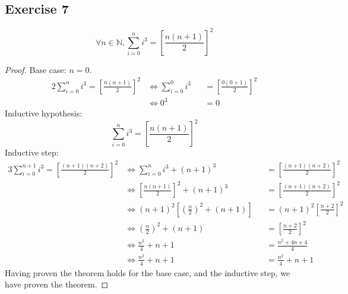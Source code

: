 \documentclass[docid=TP01]{tcom_TP}
\begin{document}
\subsection{Exercise 7}
\begin{lemma}
	\begin{equation*}
		\forall n \in \mathbb{N},\sum_{i=0}^{n}{i^3}={\left[\frac{n(n+1)}{2}\right]}^2
	\end{equation*}
\end{lemma}
\begin{proof}
	Base case: $n=0$.
	\begin{alignat*}{2}
		\sum_{i=0}^{n}{i^3}={\left[\frac{n(n+1)}{2}\right]}^2
		&\iff \sum_{i=0}^{0}{i^3} && ={\left[\frac{0(0+1)}{2}\right]}^2 \\
		&\iff 0^3 && =0
	\end{alignat*}
	Inductive hypothesis:
	\begin{equation*}
		\sum_{i=0}^{n}{i^3}={\left[\frac{n(n+1)}{2}\right]}^2
	\end{equation*}
	Inductive step:
	\begin{alignat*}{3}
		\sum_{i=0}^{n+1}{i^3}={\left[\frac{(n+1)(n+2)}{2}\right]}^2
		&\iff \sum_{i=0}^{n}{i^3} +(n+1)^3                               &&= {\left[\frac{(n+1)(n+2)}{2}\right]}^2 \\
		&\iff {\left[\frac{n(n+1)}{2}\right]}^2 +(n+1)^3                 &&= {\left[\frac{(n+1)(n+2)}{2}\right]}^2 \\
		&\iff (n+1)^2 \left[ {\left(\frac{n}{2}\right)}^2 +(n+1) \right] &&= (n+1)^2{\left[\frac{n+2}{2}\right]}^2 \\
		&\iff {\left(\frac{n}{2}\right)}^2 +(n+1)                        &&= {\left[\frac{n+2}{2}\right]}^2 \\
		&\iff \frac{n^2}{4}+n+1                                          &&= \frac{n^2+4n+4}{4} \\
		&\iff \frac{n^2}{4}+n+1                                          &&= \frac{n^2}{4}+n+1
	\end{alignat*}
	Having proven the theorem holds for the base case, and the inductive step, we have proven the theorem.
\end{proof}
\pagebreak
\end{document}
